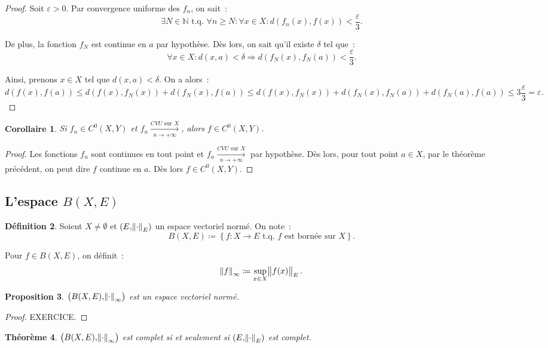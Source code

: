 \documentclass{report}
\newtheorem{thm}{Théorème}[chapter]
\newtheorem{prp}[thm]{Proposition}
\newtheorem{cor}[thm]{Corollaire}
\theoremstyle{definition}
\newtheorem{déf}[thm]{Définition}
\theoremstyle{remark}
\newcommand{\N}{\mathbb N}
\newcommand{\tq}{\text{ t.q. }}
\newcommand{\CONV}[5]{\xrightarrow[#2 \to #3]{#4 \text{ #5 } #1}}
\newcommand{\CVU}[3]{\CONV{#1}{#2}{#3}{CVU}{sur}}
\newcommand{\pinfty}{{+\infty}}
\newcommand{\evn}{espace vectoriel normé}
\begin{document}
			\begin{proof}  Soit $\varepsilon > 0$. Par convergence uniforme des $f_n$, on sait~:
			\[\exists N \in \N \tq \forall n \geq N : \forall x \in X : d(f_n(x), f(x)) < \frac \varepsilon3.\]

			De plus, la fonction $f_N$ est continue en $a$ par hypothèse. Dès lors, on sait qu'il existe $\delta$ tel que~:
			\[\forall x \in X : d(x, a) < \delta \Rightarrow d(f_N(x), f_N(a)) < \frac \varepsilon3.\]

			Ainsi, prenons $x \in X$ tel que $d(x, a) < \delta$. On a alors~:
			\[d(f(x), f(a)) \leq d(f(x), f_N(x)) + d(f_N(x), f(a)) \leq d(f(x), f_N(x)) + d(f_N(x), f_N(a)) + d(f_N(a), f(a)) \leq 3\frac \varepsilon3 = \varepsilon.\]
			\end{proof}

			\begin{cor} Si $f_n \in C^0(X, Y)$ et $f_n \CVU Xn\pinfty$, alors $f \in C^0(X, Y)$. \end{cor}

			\begin{proof} Les fonctions $f_n$ sont continues en tout point et $f_n \CVU Xn\pinfty$ par hypothèse. Dès lors, pour tout point $a \in X$, par le
			théorème précédent, on peut dire $f$ continue en $a$. Dès lors $f \in C^0(X, Y)$.
			\end{proof}

		\subsection{L'espace $B(X, E)$}
			\begin{déf} Soient $X \neq \emptyset$ et $(E, \norm \cdot_E)$ un \evn. On note~:
			\[B(X, E) \coloneqq \left\{f : X \to E \tq f \text{ est bornée sur } X\right\}.\]

			Pour $f \in B(X, E)$, on définit~:
			\[\norm f_\infty \coloneqq \sup_{x \in X}\norm {f(x)}_E.\]
			\end{déf}

			\begin{prp} $\left(B(X, E), \norm \cdot_\infty\right)$ est un \evn. \end{prp}

			\begin{proof} EXERCICE.
			\end{proof}

			\begin{thm}\label{thm:BXEcpltssiEcplt} $\left(B(X, E), \norm \cdot_\infty\right)$ est complet si et seulement si $(E, \norm \cdot_E)$ est complet.
			\end{thm}
\end{document}
